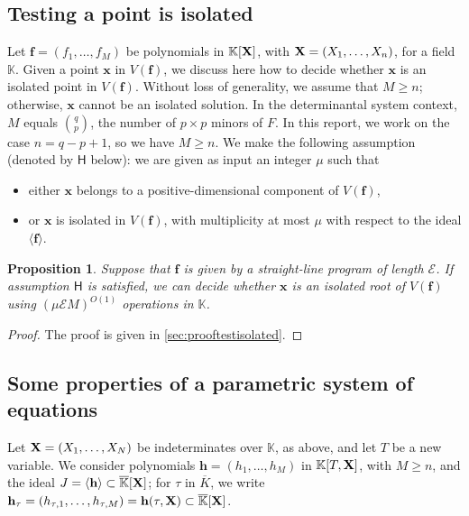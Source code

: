 \documentclass[11pt]{article}
\numberwithin{Property}{section}
\numberwithin{Theorem}{section}
\newtheorem{Proposition}{Proposition}%
\numberwithin{Proposition}{section}
\numberwithin{Lemma}{section}
\numberwithin{Corollary}{section}
\numberwithin{Definition}{section}
\numberwithin{Remark}{section}
\numberwithin{Conjecture}{section}
\numberwithin{Problem}{section}
\numberwithin{Claim}{section}
\theoremstyle{definition}
\numberwithin{Example}{section}
\renewcommand{\ge}{\geqslant}
\def\bar{\overline}
\renewcommand{\ge}{\geqslant} %
\newcommand{\field}{\mathbb{K}} %
\newcommand{\mat}[1]{\mathbf{\MakeUppercase{#1}}} %
\newcommand{\improve}[1]{\textcolor{blue}{#1}} %
\begin{document}
\subsection{Testing a point is isolated}
\label{subsec:isolated}
Let $\mathbf{f}=(f_1,\dots,f_M)$ be polynomials in $\field[\mat{X}]$, with $\mat{X}=(X_1,\dots,X_n)$, for a field $\field$. Given a point $\mathbf{x}$ in $V(\mathbf{f})$, we discuss here how to decide whether $\mathbf{x}$ is an isolated point in $V(\mathbf{f})$. Without loss of generality, we assume that $M\ge n$; otherwise, $\mathbf{x}$
cannot be an isolated solution. In the determinantal system context, $M$ equals ${q \choose p}$, the number of $p\times p$ minors of $F$. In this report, we work on the case $n = q-p+1$, so we have $M \ge n$. We make the following assumption (denoted by $\mathsf{H}$ below): we are given as input an integer $\mu$ such that
\begin{itemize}
\item either $\mathbf{x}$ belongs to a positive-dimensional component of $V(\mathbf{f})$,
\item or $\mathbf{x}$ is isolated in $V(\mathbf{f})$, with multiplicity at most $\mu$
  with respect to the ideal $\langle \mathbf{f} \rangle$.
\end{itemize}

\begin{Proposition}\label{testisolated} Suppose that $\mathbf{f}$ is given by a straight-line program of length $\mathcal{E}$. If assumption $\mathsf{H}$ is satisfied, we can decide whether $\mathbf{x}$ is an isolated root of $V(\mathbf{f})$ using $(\mu \mathcal{E} M)^{O(1)}$ operations in $\field$.
\end{Proposition}
\begin{proof}
The proof is given in \improve{\cref{sec:prooftestisolated}}. 
\end{proof}
\subsection{Some properties of a parametric system of equations}
Let $\mat{X}=(X_1,\dots,X_N)$ be indeterminates over $\field$, as above, and let $T$ be a new variable. We consider polynomials $\mathbf{h}=(h_1,\dots,h_M)$ in $\field[T,\mat{X}]$, with $M \ge n$, and the ideal $J=\langle \mathbf{h} \rangle \subset \bar{\field}[\mat{X}]$; for $\tau$ in $\bar{K}$, we write $\mathbf{h}_\tau=(h_{\tau,1},\dots,h_{\tau,M})=\mathbf{h}(\tau,\mat{X})\subset \bar{\field}[\mat{X}]$. 
\end{document}
